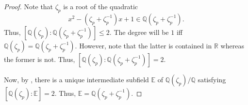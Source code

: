 \quadgeneratorcyclo*\label{prop:quadgeneratorcyclo2}
\begin{flushright}\hyperref[prop:quadgeneratorcyclo]{\upsym}\end{flushright}
\begin{proof}
    Note that $\zeta_p$ is a root of the quadratic 
    \begin{equation*} 
        x^2 - (\zeta_p + \zeta_p^{-1})x + 1 \in \mathbb{Q}(\zeta_p + \zeta_p^{-1}).
    \end{equation*}
    Thus, $[\mathbb{Q}(\zeta_p) : \mathbb{Q}(\zeta_p + \zeta_p^{-1})] \le 2.$ The degree will be $1$ iff $\mathbb{Q}(\zeta_p) = \mathbb{Q}(\zeta_p + \zeta_p^{-1}).$ However, note that the latter is contained in $\mathbb{R}$ whereas the former is not. Thus, $[\mathbb{Q}(\zeta_p) : \mathbb{Q}(\zeta_p + \zeta_p^{-1})] = 2.$

    Now, by , there is a unique intermediate subfield $\mathbb{E}$ of $\mathbb{Q}(\zeta_p)/\mathbb{Q}$ satisfying $[\mathbb{Q}(\zeta_p) : \mathbb{E}] = 2.$ Thus, $\mathbb{E} = \mathbb{Q}(\zeta_p + \zeta_p^{-1}).$
\end{proof}

